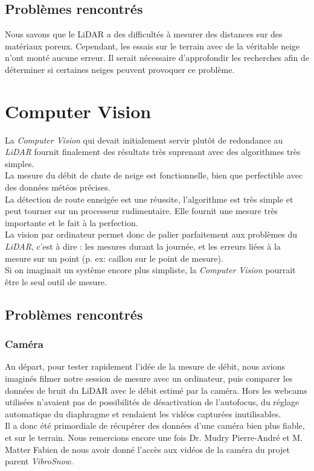 \subsection{Problèmes rencontrés}
Nous savons que le LiDAR a des difficultés à mesurer des distances sur des matériaux poreux. Cependant,
les essais sur le terrain avec de la véritable neige n'ont monté aucune erreur. Il serait nécessaire
d'approfondir les recherches afin de déterminer si certaines neiges peuvent provoquer ce problème.

\section{Computer Vision}
La \emph{Computer Vision} qui devait initialement servir plutôt de redondance au \emph{LiDAR} fournit
finalement des résultats très suprenant avec des algorithmes très simples.\\
La mesure du débit de chute de neige est fonctionnelle, bien que perfectible avec des données météos précises.\\
La détection de route enneigée est une réussite, l'algorithme est très simple et peut tourner sur un
processeur rudimentaire. Elle fournit une mesure très importante et le fait à la perfection.\\
La vision par ordinateur permet donc de palier parfaitement aux problèmes du \emph{LiDAR},
c'est à dire : les mesures durant la journée, et les erreurs liées à la mesure sur un point (p. ex: caillou sur le point de mesure).\\
Si on imaginait un système encore plus simpliste, la \emph{Computer Vision} pourrait être le seul outil de mesure.

\subsection{Problèmes rencontrés}
\subsubsection{Caméra}
Au départ, pour tester rapidement l'idée de la mesure de débit, nous avions imaginés filmer notre session
de mesure avec un ordinateur, puis comparer les données de bruit du LiDAR avec le débit estimé par
la caméra. Hors les webcams utilisées n'avaient pas de possibilités de désactivation de l'autofocus,
du réglage automatique du diaphragme et rendaient les vidéos capturées inutilisables.\\
Il a donc été primordiale de récupérer des données d'une caméra bien plus fiable, et sur le terrain.
Nous remercions encore une fois Dr. Mudry Pierre-André et M. Matter Fabien de nous avoir donné
l'accès aux vidéos de la caméra du projet parent \emph{VibroSnow\cite{VibroSnow}}.
